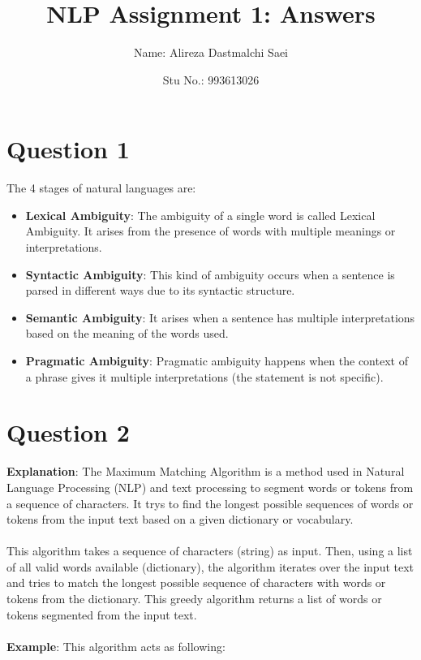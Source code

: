 \documentclass{article}
\title{\textbf{\Huge NLP Assignment 1: Answers}}
\author{Name: Alireza Dastmalchi Saei}
\date{Stu No.: 993613026}
\begin{document}
\maketitle

\pagebreak

\section{Question 1}
The 4 stages of natural languages are:
\begin{itemize}
    \item \textbf{Lexical Ambiguity}: The ambiguity of a single word is called Lexical Ambiguity. It arises from the presence of words with multiple meanings or interpretations. 
        
    \item \textbf{Syntactic Ambiguity}: This kind of ambiguity occurs when a sentence is parsed in different ways due to its syntactic structure.
    
    \item \textbf{Semantic Ambiguity}: It arises when a sentence has multiple interpretations based on the meaning of the words used. 
    
    \item \textbf{Pragmatic Ambiguity}: Pragmatic ambiguity happens when the context of a phrase gives it multiple interpretations (the statement is not specific).
    
\end{itemize} 
\pagebreak

\section{Question 2}
\textbf{Explanation}: The Maximum Matching Algorithm is a method used in Natural Language Processing (NLP) and text processing to segment words or tokens from a sequence of characters. It trys to find the longest possible sequences of words or tokens from the input text based on a given dictionary or vocabulary.\\\\
This algorithm takes a sequence of characters (string) as input. Then, using a list of all valid words available (dictionary), the algorithm iterates over the input text and tries to match the longest possible sequence of characters with words or tokens from the dictionary. This greedy algorithm returns a list of words or tokens segmented from the input text.\\\\
\textbf{Example}: This algorithm acts as following:
\end{document}
